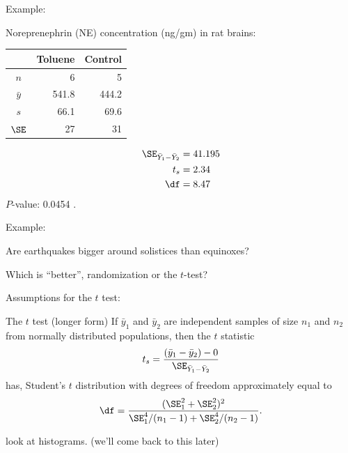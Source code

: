 \begin{frame}{Example: }

    Noreprenephrin (NE) concentration (ng/gm) in rat brains:
    \begin{center}
      \begin{tabular}{c|rr}
            & Toluene & Control \\
          \hline
          $n$ & 6 & 5 \\
          $\bar y$ & 541.8 & 444.2 \\
          $s$  & 66.1 & 69.6 \\
          $\SE$ & 27 & 31 \\
     \end{tabular}
   \end{center}


     \pause
     \begin{align*}
         \SE_{\bar Y_1 - \bar Y_2} &= 41.195 \\
         t_s &= 2.34  \\
         \df &= 8.47 
     \end{align*}
     $P$-value: 0.0454 .

\end{frame}


\begin{frame}{Example:}


    Are earthquakes bigger around solistices than equinoxes?

    \vspace{5em}
    \pause

    Which is ``better'', randomization or the $t$-test?

\end{frame}

\begin{frame}{Assumptions for the $t$ test:}

     \begin{block}{The $t$ test (longer form)}
       If $\bar y_1$ and $\bar y_2$ are \alert{independent} samples of size $n_1$ and $n_2$
         from \alert{normally distributed} populations,
         then the $t$ statistic
         \[ t_s = \frac{ (\bar y_1 - \bar y_2) - 0 }{ \SE_{\bar Y_1 - \bar Y_2} } \]
         has, Student's $t$ distribution
         with degrees of freedom approximately equal to
         \[ \df = \frac{ (\SE_1^2 + \SE_2^2)^2 }{ \SE_1^4/(n_1-1) + \SE_2^4/(n_2-1) } . \]
     \end{block}

     \vspace{2em}

      look at histograms.  (we'll come back to this later)
 
\end{frame}


